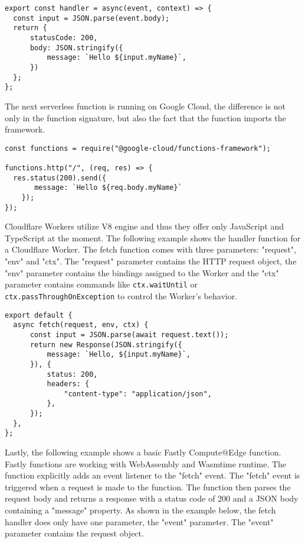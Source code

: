 \begin{lstlisting}[frame=lines, style=ES6, caption={Basic AWS Lambda handler function}, showstringspaces=false, captionpos=b,]
export const handler = async(event, context) => {
  const input = JSON.parse(event.body);
  return {
      statusCode: 200,
      body: JSON.stringify({
          message: `Hello ${input.myName}`,
      })
  };
};
\end{lstlisting}
The next \gls{serverless} function is running on Google Cloud, the difference is not only in the function signature, but also the fact that the function imports the framework.

\begin{lstlisting}[frame=lines, style=ES6, caption={Basic Gen. 2 Google Cloud handler function}, showstringspaces=false, captionpos=b,]
const functions = require("@google-cloud/functions-framework");

functions.http("/", (req, res) => {
  res.status(200).send({
       message: `Hello ${req.body.myName}`
    });
});
\end{lstlisting}

Cloudflare Workers utilize \gls{V8} engine and thus they offer only JavaScript and TypeScript at the moment. The following example shows the handler function for a Cloudflare Worker. The fetch function comes with three parameters: "request", "env" and "ctx". The "request" parameter contains the HTTP request object, the "env" parameter contains the bindings assigned to the Worker and the "ctx" parameter contains commands like \texttt{ctx.waitUntil} or \texttt{ctx.passThroughOnException} to control the Worker's behavior. 

\begin{lstlisting}[frame=lines, style=ES6, caption={Basic Cloudflare Workers hanlder function}, showstringspaces=false, captionpos=b,]
export default {
  async fetch(request, env, ctx) {
      const input = JSON.parse(await request.text());
      return new Response(JSON.stringify({
          message: `Hello, ${input.myName}`,
      }), {
          status: 200,
          headers: {
              "content-type": "application/json",
          },
      });
  },
};
\end{lstlisting}

Lastly, the following example shows a basic Fastly Compute@Edge \cite{fastlyinc_serverless} function. Fastly functions are working with WebAssembly and Wasmtime runtime. The function explicitly adds an event listener to the "fetch" event. The "fetch" event is triggered when a request is made to the function. The function then parses the request body and returns a response with a status code of 200 and a JSON body containing a "message" property. As shown in the example below, the fetch handler does only have one parameter, the "event" parameter. The "event" parameter contains the request object. 

